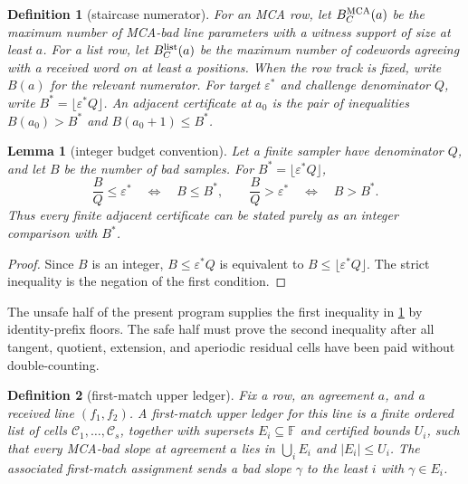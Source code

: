 \documentclass[a4paper,11pt]{amsart}
\newtheorem{lemma}[lemma]{Lemma}
\newtheorem{definition}[definition]{Definition}
\theoremstyle{remark}
\newcommand{\F}{\mathbb F}
\begin{document}
\begin{definition}[staircase numerator]\label{def:staircase}
For an MCA row, let \(B_C^{\rm MCA}(a)\) be the maximum number of MCA-bad line parameters with a witness support of size at least \(a\).  For a list row, let \(B_C^{\rm list}(a)\) be the maximum number of codewords agreeing with a received word on at least \(a\) positions.  When the row track is fixed, write \(B(a)\) for the relevant numerator.  For target \(\varepsilon^*\) and challenge denominator \(Q\), write \(B^*=\lfloor \varepsilon^* Q\rfloor\).  An adjacent certificate at \(a_0\) is the pair of inequalities \(B(a_0)>B^*\) and \(B(a_0+1)\le B^*\).
\end{definition}

\begin{lemma}[integer budget convention]\label{lem:integer-budget}
Let a finite sampler have denominator \(Q\), and let \(B\) be the number of bad samples.  For \(B^*=\lfloor\varepsilon^*Q\rfloor\),
\[
        \frac{B}{Q}\le\varepsilon^*
        \quad\Longleftrightarrow\quad
        B\le B^*,
        \qquad
        \frac{B}{Q}>\varepsilon^*
        \quad\Longleftrightarrow\quad
        B>B^* .
\]
Thus every finite adjacent certificate can be stated purely as an integer comparison with \(B^*\).
\end{lemma}

\begin{proof}
Since \(B\) is an integer, \(B\le\varepsilon^*Q\) is equivalent to \(B\le\lfloor\varepsilon^*Q\rfloor\).  The strict inequality is the negation of the first condition.
\end{proof}

The unsafe half of the present program supplies the first inequality in \cref{def:staircase} by identity-prefix floors.  The safe half must prove the second inequality after all tangent, quotient, extension, and aperiodic residual cells have been paid without double-counting.

\begin{definition}[first-match upper ledger]\label{def:first-match-ledger}
Fix a row, an agreement \(a\), and a received line \((f_1,f_2)\).  A first-match upper ledger for this line is a finite ordered list of cells \(\mathcal C_1,\ldots,\mathcal C_s\), together with supersets \(E_i\subseteq\F\) and certified bounds \(U_i\), such that every MCA-bad slope at agreement \(a\) lies in \(\bigcup_i E_i\) and \(|E_i|\le U_i\).  The associated first-match assignment sends a bad slope \(\gamma\) to the least \(i\) with \(\gamma\in E_i\).
\end{definition}
\end{document}
